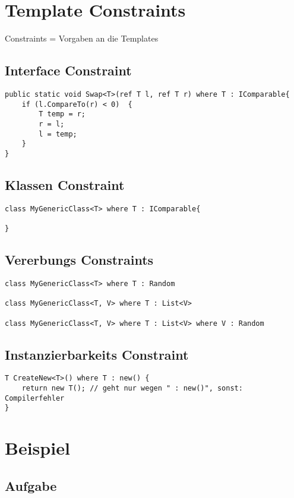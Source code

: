 \section{Template Constraints}
Constraints = Vorgaben an die Templates

\subsection{Interface Constraint}

\begin{lstlisting}[language={[Sharp]C}]
public static void Swap<T>(ref T l, ref T r) where T : IComparable{
	if (l.CompareTo(r) < 0)  {
		T temp = r;
		r = l;
		l = temp;
	}
}
\end{lstlisting}

\subsection{Klassen Constraint}
\begin{lstlisting}[language={[Sharp]C}]
class MyGenericClass<T> where T : IComparable{

}
\end{lstlisting}
\subsection{Vererbungs Constraints}

\begin{lstlisting}[language={[Sharp]C}]
class MyGenericClass<T> where T : Random

class MyGenericClass<T, V> where T : List<V>

class MyGenericClass<T, V> where T : List<V> where V : Random
\end{lstlisting}

\subsection{Instanzierbarkeits Constraint}
\begin{lstlisting}[language={[Sharp]C}]
T CreateNew<T>() where T : new() {
	return new T(); // geht nur wegen " : new()", sonst: Compilerfehler
}
\end{lstlisting}

\section{Beispiel}
\subsection{Aufgabe}

